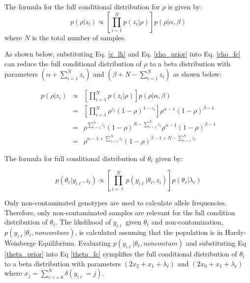 The formula for the full conditional distribution for $\rho$ is given by:
  \begin{equation} \label{rho_fc}
    p(\rho|z_i) \propto [\prod_{i=1}^{N} p(z_i|\rho)] p(\rho|\alpha,\beta)
  \end{equation}
where $N$ is the total number of samples.

As shown below, substituting Eq. \ref{z_lh} and Eq. \ref{rho_prior} into Eq. \ref{rho_fc} can reduce the full conditional distribution of $\rho$ to a beta distribution with parameters $(\alpha + \sum_{i=1}^{N} z_i)$ and $(\beta + N - \sum_{i=1}^{N} z_i)$ as shown below:

\begin{eqnarray} \label{rho_simpfc}
  p(\rho|z_i) &\propto& [\prod_{i=1}^{N} p(z_i|\rho)] p    (\rho|\alpha,\beta) \nonumber \\
  &=& [\prod_{i=1}^{N} \rho^{z_i}(1 - \rho)^{1 - z_i}] \rho^{\alpha - 1}(1 - \rho)^{\beta-1} \nonumber \\
  &=& \rho^{\sum_{i=1}^{N} z_i}(1-\rho)^{N - \sum_{i=1}^{N} z_i} \rho^{\alpha -1} (1-\rho)^{\beta-1} \nonumber \\
  &=& \rho^{\alpha - 1 + \sum_{i=1}^{N} z_i}(1 - \rho)^{\beta -1 + N - \sum_{i=1}^{N} z_i}
\end{eqnarray}

The formula for full conditional distribution of $\theta_{\ell}$ given by:

\begin{equation} \label{theta_fc}
p(\theta_{\ell}|y_{i\ell},z_i) \propto [\prod_{i=\ell}^{N} p(y_{i\ell}|\theta_{\ell},z_i)]p(\theta_{\ell}|\lambda_{\ell})
\end{equation}

Only non-contaminated genotypes are used to calculate allele frequencies.  Therefore, only non-contaminated samples are relevant for the full condition distribution of $\theta_{\ell}$.  The likelihood of $y_{i\ell}$ given $\theta_{\ell}$ and non-contamination, $p(y_{i\ell}|\theta_{\ell},noncontam)$, is calculated assuming that the population is in Hardy-Weinberge Equilibrium. Evaluating $p(y_{i\ell}|\theta_{\ell},noncontam)$ and substituting Eq \ref{theta_prior} into Eq \ref{theta_fc} symplifies the full conditional distribution of $\theta_{\ell}$ to a beta distribution with parameters $(2x_2 + x_1 + \lambda_{\ell})$ and $(2x_0 + x_1 + \lambda_{\ell})$ where $x_j = \sum_{i:z=0}^{N} \delta(y_{i\ell} = j)$. 

